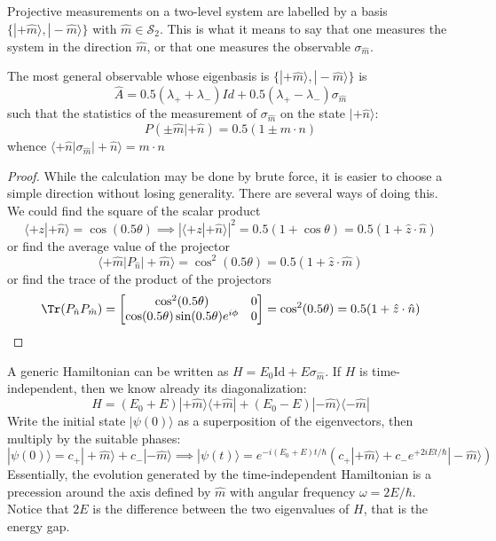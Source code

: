 \documentclass[a4paper]{article}
\begin{document}
\begin{defi}
Projective measurements on a two-level system are labelled by a basis $\{|+\hat{m}\rangle,|-\hat{m}\rangle\}$ with $\hat{m}\in\mathcal{S}_2$. This is what it means to say that one measures the system in the direction $\hat{m}$, or that one measures the observable $\sigma_{\hat{m}}$.
\end{defi}
\begin{thm}
The most general observable whose eigenbasis is $\{|+\hat{m}\rangle,|-\hat{m}\rangle\}$ is
$$\hat{A}=0.5(\lambda_++\lambda_-)Id+0.5(\lambda_+-\lambda_-)\sigma_{\hat{m}}$$
such that the statistics of the measurement of $\sigma_{\hat{m}}$ on the state $|+\hat{n}\rangle$: 
$$P(\pm\hat{m}|+\hat{n})=0.5(1\pm m\cdot n)$$
whence $\langle+\hat{n}|\sigma_{\hat{m}}|+\hat{n}\rangle=m\cdot n$
\end{thm}
\begin{proof}
While the calculation may be done by brute force, it is easier to choose a simple direction without losing generality. There are several ways of doing this. We could find the square of the scalar product
$$\langle+z|+\hat{n}\rangle=\cos(0.5\theta)\implies|\langle+z|+\hat{n}\rangle|^2=0.5(1+\cos\theta)=0.5(1+\hat{z}\cdot\hat{n})$$
or find the average value of the projector
$$\langle+\hat{m}|P_{\hat{n}}|+\hat{m}\rangle=\cos^2(0.5\theta)=0.5(1+\hat{z}\cdot\hat{m})$$
or find the trace of the product of the projectors
$$\Tr(P_{\hat{n}}P_{\hat{m}})=\begin{bmatrix}\cos^2(0.5\theta)&0\\\cos(0.5\theta)\sin(0.5\theta)e^{i\phi}&0\\\end{bmatrix}=\cos^2(0.5\theta)=0.5(1+\hat{z}\cdot\hat{n})$$
\end{proof}
\begin{eg}
A generic Hamiltonian can be written as $H=E_0\text{Id}+E\sigma_{\hat{m}}$. If $H$ is time-independent, then we know already its diagonalization:
$$H=(E_0+E)|+\hat{m}\rangle\langle+\hat{m}|+(E_0-E)|-\hat{m}\rangle\langle-\hat{m}|$$
Write the initial state $|\psi(0)\rangle$ as a superposition of the eigenvectors, then multiply by the suitable phases:
$$|\psi(0)\rangle=c_+|+\hat{m}\rangle+c_-|-\hat{m}\rangle\implies|\psi(t)\rangle=e^{-i(E_0+E)t/\hbar}(c_+|+\hat{m}\rangle+c_-e^{+2iEt/\hbar}|-\hat{m}\rangle)$$
Essentially, the evolution generated by the time-independent Hamiltonian is a precession around the axis defined by $\hat{m}$ with angular frequency $\omega=2E/\hbar$. Notice that $2E$ is the difference between the two eigenvalues of $H$, that is the energy gap.
\end{eg}
\end{document}
